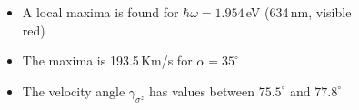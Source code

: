 \documentclass{beamer}
\begin{document}


\begin{frame}

\begin{columns}


{\small

\begin{itemize}

\item 
A local maxima is found for $\hbar \omega = 1.954$\,eV (634\,nm, visible
red)

\item 
The maxima is 193.5\,Km/s for $\alpha = 35^{\circ}$

\item 
The velocity angle $\gamma_{\sigma^{z}}$ has values between $75.5^{\circ}$
and $77.8^{\circ}$

\end{itemize}

}

\vspace{-6mm}
\begin{center}

\begin{figure}[h!]
\end{figure}
\end{center}
\end{columns}
\end{frame}
\end{document}
